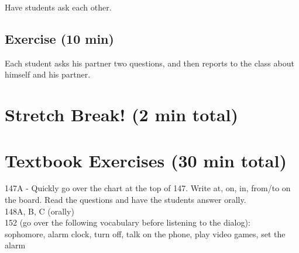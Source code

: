 \documentclass{tufte-handout}
\begin{document}
Have students ask each other.

\subsection{Exercise (10 min)}
Each student asks his partner two questions, and then reports to the class about himself and his partner.

\section{Stretch Break! (2 min total)}

\section{Textbook Exercises (30 min total)}
147A - Quickly go over the chart at the top of 147. Write at, on, in, from/to on the board. Read the questions and have the students answer orally.\\
148A, B, C (orally)\\
152 (go over the following vocabulary before listening to the dialog):\\
sophomore, alarm clock, turn off, talk on the phone, play video games, set the alarm
\end{document}

